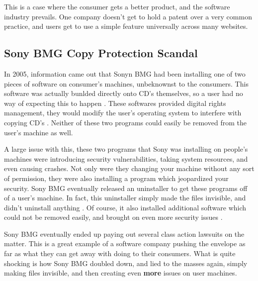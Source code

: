 \documentclass[12pt,letterpaper]{article}
\begin{document}
This is a case where the consumer gets a better product, and the software industry prevails. One company doesn't get to hold a patent over a very common practice, and users get to use a simple feature universally across many websites.

\subsection{Sony BMG Copy Protection Scandal}
In 2005, information came out that Sonyn BMG had been installing one of two pieces of software on consumer's machines, unbeknownst to the consumers. This software was actually bunlded directly onto CD's themselves, so a user had no way of expecting this to happen \cite{sony}. These softwares provided digital rights management, they would modify the user's operating system to interfere with copying CD's \cite{sony}. Neither of these two programs could easily be removed from the user's machine as well.

A large issue with this, these two programs that Sony was installing on people's machines were introducing security vulnerabilities, taking system resources, and even causing crashes. Not only were they changing your machine without any sort of permission, they were also installing a program which jeopardized your security. Sony BMG eventually released an uninstaller to get these programs off of a user's machine. In fact, this uninstaller simply made the files invisible, and didn't uninstall anything \cite{sony}. Of course, it also installed additional software which could not be removed easily, and brought on even more security issues \cite{sony}.

Sony BMG eventually ended up paying out several class action lawsuits on the matter. This is a great example of a software company pushing the envelope as far as what they can get away with doing to their consumers. What is quite shocking is how Sony BMG doubled down, and lied to the masses again, simply making files invisible, and then creating even \textbf{more} issues on user machines.

\pagebreak
\end{document}
